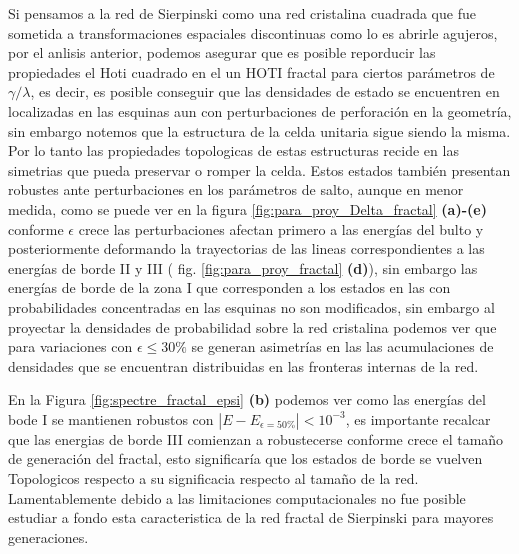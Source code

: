 Si pensamos a la red de Sierpinski como una red cristalina cuadrada que fue sometida a transformaciones espaciales discontinuas como lo es abrirle agujeros, por el anlisis anterior, podemos asegurar que es posible reporducir las propiedades el Hoti cuadrado en el un HOTI fractal para ciertos parámetros de $\gamma/\lambda$, es decir, es posible conseguir que las densidades de estado se encuentren en localizadas en las esquinas aun con perturbaciones de perforación en la geometría, sin embargo notemos que la estructura de la celda unitaria sigue siendo la misma. Por lo tanto las propiedades topologicas de estas estructuras recide en las simetrias que pueda preservar o romper la celda. 
Estos estados también presentan robustes ante perturbaciones en los parámetros de salto, aunque en menor medida, como se puede ver en la figura \ref{fig:para_proy_Delta_fractal} \textbf{(a)-(e)} conforme $\epsilon$ crece las perturbaciones afectan primero a las energías del bulto y posteriormente deformando la trayectorias de las lineas correspondientes a las energías de borde II y III ( fig. \ref{fig:para_proy_fractal} \textbf{(d)}), sin embargo las energías de borde de la zona I  que corresponden a los estados en las con probabilidades concentradas en las esquinas no son modificados, sin embargo al proyectar la densidades de probabilidad sobre la red cristalina podemos ver que para variaciones con $\epsilon \leq 30\%$ se generan asimetrías en las las acumulaciones de densidades que se encuentran distribuidas en las fronteras internas de la red.

En la Figura \ref{fig:spectre_fractal_epsi} \textbf{(b)} podemos ver como las energías del bode I  se mantienen robustos con $|E - E_{\epsilon = 50\%}| < 10^{-3}$, es importante recalcar que las energias de borde III comienzan a robustecerse conforme crece el tamaño de generación del fractal, esto significaría que los estados de borde se vuelven Topologicos respecto a su significacia respecto al tamaño de la red. Lamentablemente debido a las limitaciones computacionales no fue posible estudiar a fondo esta caracteristica de la red fractal de Sierpinski para mayores generaciones.







